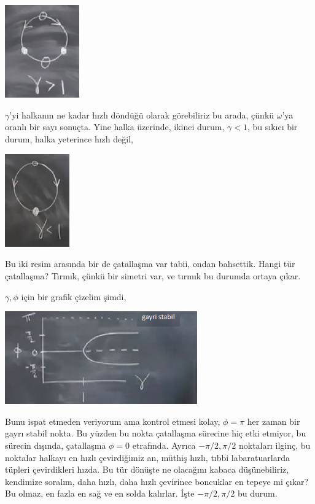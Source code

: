 \documentclass[12pt,fleqn]{article}\usepackage{../../common}
\begin{document}
\includegraphics[height=4cm]{03_05.png}

$\gamma$'yi halkanın ne kadar hızlı döndüğü olarak görebiliriz bu arada, çünkü
$\omega$'ya oranlı bir sayı sonuçta. Yine halka üzerinde, ikinci durum, $\gamma <
1$, bu sıkıcı bir durum, halka yeterince hızlı değil,

\includegraphics[height=4cm]{03_06.png}

Bu iki resim arasında bir de çatallaşma var tabii, ondan bahsettik. Hangi tür
çatallaşma? Tırmık, çünkü bir simetri var, ve tırmık bu durumda ortaya çıkar. 

$\gamma,\phi$ için bir grafik çizelim şimdi,

\includegraphics[height=4cm]{03_07.png}

Bunu ispat etmeden veriyorum ama kontrol etmesi kolay, $\phi=\pi$ her zaman bir
gayrı stabil nokta. Bu yüzden bu nokta çatallaşma sürecine hiç etki etmiyor, bu
sürecin dışında, çatallaşma $\phi=0$ etrafında. Ayrıca $-\pi/2,\pi/2$ noktaları
ilginç, bu noktalar halkayı en hızlı çevirdiğimiz an, müthiş hızlı, tıbbi
labaratuarlarda tüpleri çevirdikleri hızda. Bu tür dönüşte ne olacağını kabaca
düşünebiliriz, kendimize soralım, daha hızlı, daha hızlı çevirince boncuklar en
tepeye mi çıkar? Bu olmaz, en fazla en sağ ve en solda kalırlar. İşte
$-\pi/2,\pi/2$ bu durum. 
\end{document}
